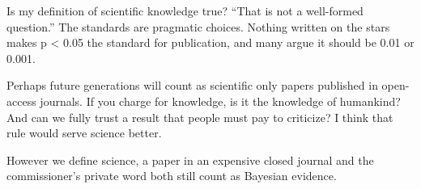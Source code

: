 Is my definition of scientific knowledge true? ``That is not a well-formed question.'' The standards are pragmatic choices. Nothing written on the stars makes p < 0.05 the standard for publication, and many argue it should be 0.01 or 0.001. 

Perhaps future generations will count as scientific only papers published in open-access journals. If you charge for knowledge, is it the knowledge of humankind? And can we fully trust a result that people must pay to criticize? I think that rule would serve science better.

However we define science, a paper in an expensive closed journal and the commissioner's private word both still count as Bayesian evidence.
